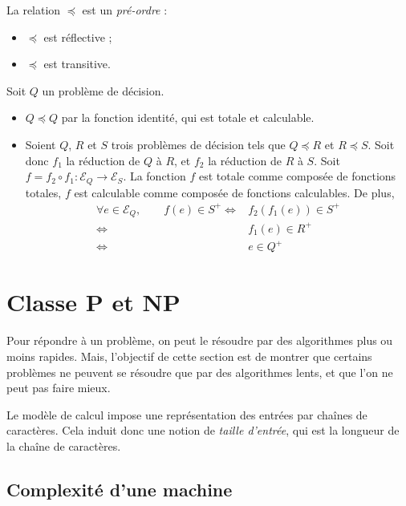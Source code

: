 \begin{prop}
	La relation $\preceq$\/ est un \textit{pré-ordre} :
	\begin{itemize}
		\item $\preceq $\/ est réflective ;
		\item $\preceq $\/ est transitive.
	\end{itemize}
\end{prop}

\begin{prv}
	Soit $Q$\/ un problème de décision.
	\begin{itemize}
		\item $Q \preceq Q$\/ par la fonction identité, qui est totale et calculable.
		\item Soient $Q$, $R$\/ et $S$\/ trois problèmes de décision tels que $Q \preceq R$\/ et $R \preceq S$. Soit donc $f_1$\/ la réduction de $Q$\/ à $R$, et $f_2$\/ la réduction de $R$\/ à $S$. Soit $f = f_2 \circ f_1 : \mathcal{E}_Q \to \mathcal{E}_S$. La fonction $f$\/ est totale comme composée de fonctions totales, $f$\/ est calculable comme composée de fonctions calculables. De plus,
			\begin{align*}
				\forall e \in \mathcal{E}_Q,\qquad f(e) \in S^+ \iff& f_2(f_1(e)) \in S^+\\
				\iff& f_1(e) \in R^+\\
				\iff& e \in Q^+
			\end{align*}
	\end{itemize}
\end{prv}

\section{Classe \textbf{P} et \textbf{NP}}

Pour répondre à un problème, on peut le résoudre par des algorithmes plus ou moins rapides. Mais, l'objectif de cette section est de montrer que certains problèmes ne peuvent se résoudre que par des algorithmes lents, et que l'on ne peut pas faire mieux.

\begin{defn}
	Le modèle de calcul impose une représentation des entrées par chaînes de caractères. Cela induit donc une notion de \textit{taille d'entrée}, qui est la longueur de la chaîne de caractères.
\end{defn}


\subsection{Complexité d'une machine}


